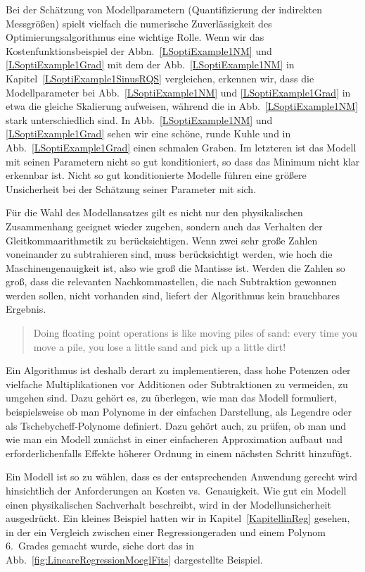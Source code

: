 Bei der Schätzung von Modellparametern (Quantifizierung der indirekten Messgrößen)
spielt vielfach die numerische Zuverlässigkeit des Optimierungsalgorithmus eine
wichtige Rolle. Wenn wir das Kostenfunktionsbeispiel der Abbn.~\ref{LSoptiExample1NM} und \ref{LSoptiExample1Grad}
mit dem der Abb.~\ref{LSoptiExample1NM} in Kapitel~\ref{LSoptiExample1SinusRQS} vergleichen,
erkennen wir, dass die Modellparameter bei Abb.~\ref{LSoptiExample1NM} und \ref{LSoptiExample1Grad}
in etwa die gleiche Skalierung aufweisen, während die in Abb.~\ref{LSoptiExample1NM} stark unterschiedlich sind. In Abb.~\ref{LSoptiExample1NM} und \ref{LSoptiExample1Grad} sehen wir eine schöne, runde
Kuhle und in Abb.~\ref{LSoptiExample1Grad} einen schmalen Graben. Im letzteren ist das Modell mit seinen
Parametern nicht so gut konditioniert, so dass das Minimum nicht klar erkennbar ist.
Nicht so gut konditionierte Modelle führen eine größere Unsicherheit bei der Schätzung
seiner Parameter mit sich.

Für die Wahl des Modellansatzes gilt es nicht nur den physikalischen Zusammenhang
geeignet wieder zugeben, sondern auch das Verhalten der Gleitkommaarithmetik zu
berücksichtigen. Wenn zwei sehr große Zahlen voneinander zu subtrahieren sind, muss
berücksichtigt werden, wie hoch die Maschinengenauigkeit ist, also wie groß die
Mantisse ist. Werden die Zahlen so groß, dass die relevanten Nachkommastellen, die
nach Subtraktion gewonnen werden sollen, nicht vorhanden sind, liefert der Algorithmus
kein brauchbares Ergebnis.
\begin{quote}
Doing floating point operations is like moving piles of sand: every
time you move a pile, you lose a little sand and pick up a little dirt!
\end{quote}
Ein Algorithmus ist deshalb derart zu implementieren, dass hohe Potenzen oder
vielfache Multiplikationen vor Additionen oder Subtraktionen zu vermeiden, zu umgehen
sind. Dazu gehört es, zu überlegen, wie man das Modell formuliert, beispielsweise
ob man Polynome in der einfachen Darstellung, als Legendre oder als Tschebycheff-Polynome
definiert. Dazu gehört auch, zu prüfen, ob man und wie man ein Modell zunächst in einer
einfacheren Approximation aufbaut und erforderlichenfalls Effekte höherer Ordnung in
einem nächsten Schritt hinzufügt.

Ein Modell ist so zu wählen, dass es der entsprechenden Anwendung gerecht wird
hinsichtlich der Anforderungen an Kosten vs.\ Genauigkeit. Wie gut ein Modell einen
physikalischen Sachverhalt beschreibt, wird in der Modellunsicherheit ausgedrückt.
Ein kleines Beispiel hatten wir in Kapitel~\ref{KapitellinReg} gesehen, in der ein Vergleich
zwischen einer Regressiongeraden und einem Polynom 6.\ Grades gemacht wurde, siehe
dort das in Abb.~\ref{fig:LineareRegressionMoeglFits} dargestellte Beispiel.


